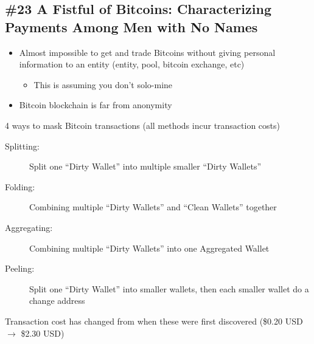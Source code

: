 \subsection{\#23 A Fistful of Bitcoins: Characterizing Payments Among Men with No Names}
\begin{itemize}
	\item Almost impossible to get and trade Bitcoins without giving personal information to an entity (entity, pool, bitcoin exchange, etc)
	\begin{itemize}
		\item This is assuming you don't solo-mine
	\end{itemize}
	\item Bitcoin blockchain is far from anonymity
\end{itemize}
4 ways to mask Bitcoin transactions (all methods incur transaction costs)
\begin{description}
	\item[Splitting:] Split one ``Dirty Wallet'' into multiple smaller ``Dirty Wallets''
	\item[Folding:] Combining multiple ``Dirty Wallets'' and ``Clean Wallets'' together
	\item[Aggregating:] Combining multiple ``Dirty Wallets'' into one Aggregated Wallet
	\item[Peeling:] Split one ``Dirty Wallet'' into smaller wallets, then each smaller wallet do a change address
\end{description}
Transaction cost has changed from when these were first discovered (\$0.20 USD $\rightarrow$ \$2.30 USD)